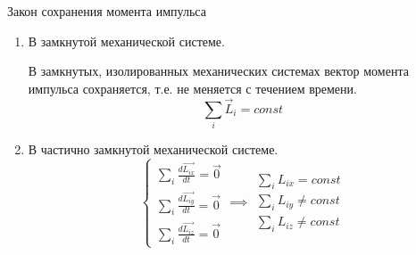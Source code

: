 \begin{definition}
    Закон сохранения момента импульса
    \begin{enumerate}
        \item В замкнутой механической системе.
        
        В замкнутых, изолированных механических системах вектор момента импульса сохраняется, т.е. не меняется с течением времени.
        $$\sum_i\vec L_i=const$$

        \item В частично замкнутой механической системе.
        $$\begin{cases}
            \sum\limits_i\frac{d\vec{L_{ix}}}{dt} = \vec{0} \\
            \sum\limits_i\frac{d\vec{L_{iy}}}{dt} = \vec{0} \\
            \sum\limits_i\frac{d\vec{L_{iz}}}{dt} = \vec{0} 
        \end{cases} \implies
        \begin{aligned}
            \sum\limits_i L_{ix} = const \\
            \sum\limits_i L_{iy} \neq const \\
            \sum\limits_i L_{iz} \neq const 
        \end{aligned}$$
    \end{enumerate}
\end{definition}

